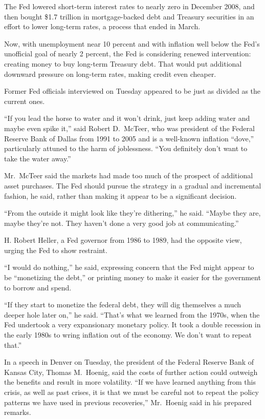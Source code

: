﻿\documentclass[12pt]{article}
\begin{document}
The Fed lowered short-term interest rates to nearly zero in December 2008, and then bought \$1.7
trillion in mortgage-backed debt and Treasury securities in an effort to lower long-term rates, a
process that ended in March.

Now, with unemployment near 10 percent and with inflation well below the Fed's unofficial goal of
nearly 2 percent, the Fed is considering renewed intervention: creating money to buy long-term
Treasury debt. That would put additional downward pressure on long-term rates, making credit even
cheaper.

Former Fed officials interviewed on Tuesday appeared to be just as divided as the current ones.

``If you lead the horse to water and it won't drink, just keep adding water and maybe even spike
it,'' said Robert D.~McTeer, who was president of the Federal Reserve Bank of Dallas from 1991 to
2005 and is a well-known inflation ``dove,'' particularly attuned to the harm of joblessness. ``You
definitely don't want to take the water away.''

Mr.~McTeer said the markets had made too much of the prospect of additional asset purchases. The Fed
should pursue the strategy in a gradual and incremental fashion, he said, rather than making it
appear to be a significant decision.

``From the outside it might look like they're dithering,'' he said. ``Maybe they are, maybe they're
not. They haven't done a very good job at communicating.''

H. Robert Heller, a Fed governor from 1986 to 1989, had the opposite view, urging the Fed to show
restraint.

``I would do nothing,'' he said, expressing concern that the Fed might appear to be ``monetizing the
debt,'' or printing money to make it easier for the government to borrow and spend.

``If they start to monetize the federal debt, they will dig themselves a much deeper hole later
on,'' he said. ``That's what we learned from the 1970s, when the Fed undertook a very expansionary
monetary policy. It took a double recession in the early 1980s to wring inflation out of the
economy. We don't want to repeat that.''

In a speech in Denver on Tuesday, the president of the Federal Reserve Bank of Kansas City, Thomas
M.~Hoenig, said the costs of further action could outweigh the benefits and result in more
volatility. ``If we have learned anything from this crisis, as well as past crises, it is that we
must be careful not to repeat the policy patterns we have used in previous recoveries,'' Mr.~Hoenig
said in his prepared remarks.
\end{document}
